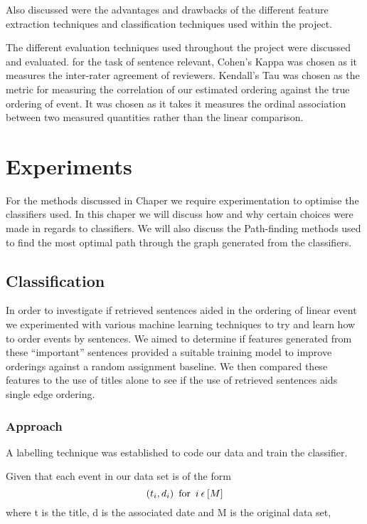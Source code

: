 \documentclass[bsc,frontabs,twoside,singlespacing,parskip,deptreport]{infthesis}     %
\begin{document}
Also discussed were the advantages and  drawbacks of the different feature extraction techniques and classification
techniques used within the project.

The different evaluation techniques used throughout the project were discussed and evaluated. 
for the task of sentence relevant, Cohen's Kappa \cite{wood2007understanding} was chosen as it measures the inter-rater agreement of
reviewers. Kendall's Tau \cite{abdi2007kendall} was chosen as the metric for measuring the correlation of our estimated ordering
against the true ordering of event. It was chosen as it takes it measures the ordinal association between two
measured quantities rather than the linear comparison.


\chapter{Experiments}
For the methods discussed in Chaper \cite{chapter:methods} we require experimentation to optimise the classifiers used.
In this chaper we will discuss how and why certain choices were made in regards to classifiers.
We will also discuss the Path-finding methods used to find the most optimal path through the graph generated from the
classifiers.

\section{Classification}
In order to investigate if retrieved sentences aided in the  ordering of linear event we experimented with various
machine learning techniques to try and learn how to order events by sentences.
We aimed to determine if features generated from these ``important'' sentences provided a suitable training model
to improve orderings against a random assignment baseline. We then compared these features to the use of titles alone
to see if the use of retrieved sentences aids single edge ordering.


\subsection{Approach}
A labelling technique was established to code our data and train the classifier.

 Given that each event in our data set is of the form
  \begin{equation}
  (t_{i},d_{i}) \hspace{0.5em} \text{for} \hspace{0.5em} i \hspace{0.2em}\epsilon \hspace{0.2em} [M]\nonumber
    \end{equation}
    where t is the title, d is the associated date and M is the original data set,
\end{document}
